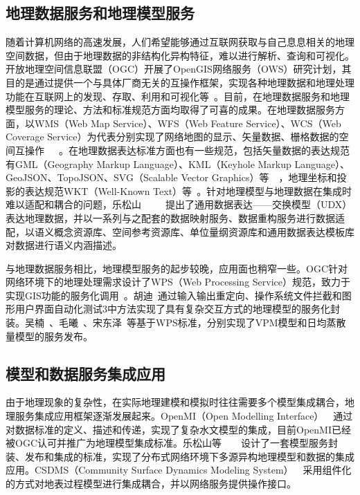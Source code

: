 \subsection{地理数据服务和地理模型服务}
随着计算机网络的高速发展，人们希望能够通过互联网获取与自己息息相关的地理空间数据，但由于地理数据的非结构化异构特征，难以进行解析、查询和可视化。开放地理空间信息联盟（OGC）开展了OpenGIS网络服务（OWS）研究计划，其目的是通过提供一个与具体厂商无关的互操作框架，实现各种地理数据和地理处理功能在互联网上的发现、存取、利用和可视化等~\cite{lake2009infrastructure}。目前，在地理数据服务和地理模型服务的理论、方法和标准规范方面均取得了可喜的成果。在地理数据服务方面，以WMS（Web Map Service）、WFS（Web Feature Service）、WCS（Web Coverage Service）为代表分别实现了网络地图的显示、矢量数据、栅格数据的空间互操作~\cite{OGC-WMS}~\cite{OGC-WCS}~\cite{OGC-WFS}。在地理数据表达标准方面也有一些规范，包括矢量数据的表达规范有GML（Geography Markup Language）、KML（Keyhole Markup Language）、GeoJSON、TopoJSON、SVG（Scalable Vector Graphics）等~\cite{GML}~\cite{KML}，地理坐标和投影的表达规范WKT（Well-Known Text）等~\cite{lott2015geographic}。针对地理模型与地理数据在集成时难以适配和耦合的问题，乐松山~\cite{Yue2015A}~\cite{Yue2013Key}~\cite{yue2015data}~\cite{wang2018study}~\cite{乐松山2016面向地理模型共享与集成的数据适配方法研究}提出了通用数据表达——交换模型（UDX）表达地理数据，并以一系列与之配套的数据映射服务、数据重构服务进行数据适配，以语义概念资源库、空间参考资源库、单位量纲资源库和通用数据表达模板库对数据进行语义内涵描述。

与地理数据服务相比，地理模型服务的起步较晚，应用面也稍窄一些。OGC针对网络环境下的地理处理需求设计了WPS（Web Processing Service）规范，致力于实现GIS功能的服务化调用~\cite{OGC-WPS}。胡迪~\cite{胡迪2015地理模型的服务化封装方法研究}通过输入输出重定向、操作系统文件拦截和图形用户界面自动化测试3中方法实现了具有复杂交互方式的地理模型的服务化封装。吴楠~\cite{吴楠2012基于}、毛曦~\cite{毛曦2012基于}、宋东泽~\cite{宋东泽2015一个生态传感网的}等基于WPS标准，分别实现了VPM模型和日均蒸散量模型的服务发布。

\subsection{模型和数据服务集成应用}
由于地理现象的复杂性，在实际地理建模和模拟时往往需要多个模型集成耦合，地理服务集成应用框架逐渐发展起来。OpenMI（Open Modelling Interface）~\cite{MOORE2005279}~\cite{gregersen2007openmi}通过对数据标准的定义、描述和传递，实现了复杂水文模型的集成，目前OpenMI已经被OGC认可并推广为地理模型集成标准。乐松山等~\cite{yue2016service}~\cite{zhang2019design}~\cite{wen2017model}~\cite{yue2018loosely}设计了一套模型服务封装、发布和集成的标准，实现了分布式网络环境下多源异构地理模型和数据的集成应用。CSDMS（Community Surface Dynamics Modeling System）~\cite{Peckham2013A}~\cite{peckham2009componentizing}采用组件化的方式对地表过程模型进行集成耦合，并以网络服务提供操作接口。



